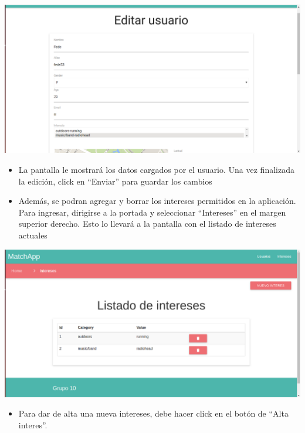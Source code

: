 \documentclass[letterpaper,10pt,english]{sphinxmanual}
\begin{document}
\includegraphics{shared_editUsuarios.png}
\begin{itemize}
\item {} 
La pantalla le mostrará los datos cargados por el usuario. Una vez finalizada la edición, click en ``Enviar'' para guardar los cambios

\item {} 
Además, se podran agregar y borrar los intereses permitidos en la aplicación. Para ingresar, dirigirse a la portada y seleccionar ``Intereses'' en el margen superior derecho. Esto lo llevará a la pantalla con el listado de intereses actuales

\end{itemize}

\includegraphics{shared_listadoIntereses.png}
\begin{itemize}
\item {} 
Para dar de alta una nueva intereses, debe hacer click en el botón de ``Alta interes''.

\end{itemize}
\end{document}
